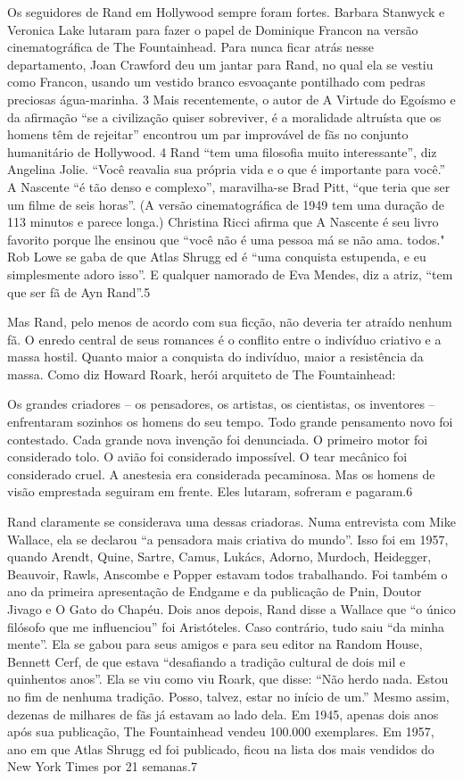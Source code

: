 Os seguidores de Rand em Hollywood sempre foram fortes. Barbara Stanwyck e Veronica Lake lutaram para fazer o papel de Dominique Francon na versão cinematográfica de The Fountainhead. Para nunca ficar atrás nesse departamento, Joan Crawford deu um jantar para Rand, no qual ela se vestiu como Francon, usando um vestido branco esvoaçante pontilhado com pedras preciosas água-marinha. {\color{blue}3} Mais recentemente, o autor de A Virtude do Egoísmo e da afirmação “se a civilização quiser sobreviver, é a moralidade altruísta que os homens têm de rejeitar” encontrou um par improvável de fãs no conjunto humanitário de Hollywood. {\color{blue}4} Rand “tem uma filosofia muito interessante”, diz Angelina Jolie. “Você reavalia sua própria vida e o que é importante para você.” A Nascente “é tão denso e complexo”, maravilha-se Brad Pitt, “que teria que ser um filme de seis horas”. (A versão cinematográfica de 1949 tem uma duração de {\color{blue}113} minutos e parece longa.) Christina Ricci afirma que A Nascente é seu livro favorito porque lhe ensinou que “você não é uma pessoa má se não ama. todos." Rob Lowe se gaba de que Atlas Shrugg ed é “uma conquista estupenda, e eu simplesmente adoro isso”. E qualquer namorado de Eva Mendes, diz a atriz, “tem que ser fã de Ayn Rand”.{\color{blue}5}
 \par 
Mas Rand, pelo menos de acordo com sua ficção, não deveria ter atraído nenhum fã. O enredo central de seus romances é o conflito entre o indivíduo criativo e a massa hostil. Quanto maior a conquista do indivíduo, maior a resistência da massa. Como diz Howard Roark, herói arquiteto de The Fountainhead:
 \par 
Os grandes criadores – os pensadores, os artistas, os cientistas, os inventores – enfrentaram sozinhos os homens do seu tempo. Todo grande pensamento novo foi contestado. Cada grande nova invenção foi denunciada. O primeiro motor foi considerado tolo. O avião foi considerado impossível. O tear mecânico foi considerado cruel. A anestesia era considerada pecaminosa. Mas os homens de visão emprestada seguiram em frente. Eles lutaram, sofreram e pagaram.{\color{blue}6}
 \par 
Rand claramente se considerava uma dessas criadoras. Numa entrevista com Mike Wallace, ela se declarou “a pensadora mais criativa do mundo”. Isso foi em 1957, quando Arendt, Quine, Sartre, Camus, Lukács, Adorno, Murdoch, Heidegger, Beauvoir, Rawls, Anscombe e Popper estavam todos trabalhando. Foi também o ano da primeira apresentação de Endgame e da publicação de Pnin, Doutor Jivago e O Gato do Chapéu. Dois anos depois, Rand disse a Wallace que “o único filósofo que me influenciou” foi Aristóteles. Caso contrário, tudo saiu “da minha mente”. Ela se gabou para seus amigos e para seu editor na Random House, Bennett Cerf, de que estava “desafiando a tradição cultural de dois mil e quinhentos anos”. Ela se viu como viu Roark, que disse: “Não herdo nada. Estou no fim de nenhuma tradição. Posso, talvez, estar no início de um.” Mesmo assim, dezenas de milhares de fãs já estavam ao lado dela. Em 1945, apenas dois anos após sua publicação, The Fountainhead vendeu {\color{blue}100}.000 exemplares. Em 1957, ano em que Atlas Shrugg ed foi publicado, ficou na lista dos mais vendidos do New York Times por {\color{blue}21} semanas.{\color{blue}7}
